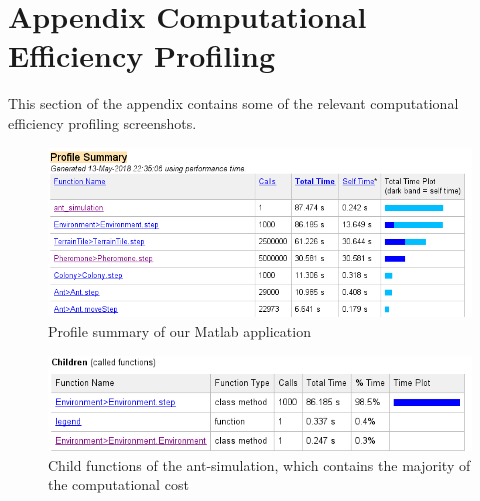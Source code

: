 \section{Appendix Computational Efficiency Profiling}

This section of the appendix contains some of the relevant computational efficiency profiling screenshots.

 \begin{figure}[htb]
  \centering
 \includegraphics[width=1\textwidth]{images/appendix1.png}
  \caption{Profile summary of our Matlab application}
  \label{fig:appendix1}
\end{figure}

 \begin{figure}[htb]
  \centering
  \includegraphics[width=1\textwidth]{images/appendix2.png}
  \caption{Child functions of the ant-simulation, which contains the majority of the computational cost}
  \label{fig:appendix2}
\end{figure}